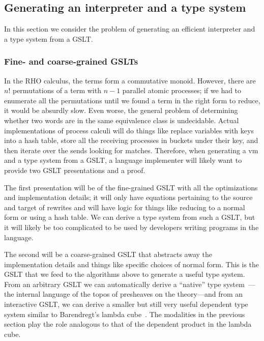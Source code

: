 \documentclass{article}
\begin{document}
\subsection{Generating an interpreter and a type system}
\label{Generating an interpreter and a type system}

In this section we consider the problem of generating an efficient interpreter and a type system from a GSLT.

\subsubsection{Fine- and coarse-grained GSLTs}
In the RHO calculus, the terms form a commutative monoid.  However, there are $n!$ permutations of a term with $n-1$ parallel atomic processes; if we had to enumerate all the permutations until we found a term in the right form to reduce, it would be absurdly slow.  Even worse, the general problem of determining whether two words are in the same equivalence class is undecidable.  Actual implementations of process calculi will do things like replace variables with keys into a hash table, store all the receiving processes in buckets under their key, and then iterate over the sends looking for matches.  Therefore, when generating a vm and a type system from a GSLT, a language implementer will likely want to provide two GSLT presentations and a proof.

The first presentation will be of the fine-grained GSLT with all the optimizations and implementation details; it will only have equations pertaining to the source and target of rewrites and will have logic for things like reducing to a normal form or using a hash table.  We can derive a type system from such a GSLT, but it will likely be too complicated to be used by developers writing programs in the language.

The second will be a coarse-grained GSLT that abstracts away the implementation details and things like specific choices of normal form.  This is the GSLT that we feed to the algorithms above to generate a useful type system.  From an arbitrary GSLT we can automatically derive a ``native'' type system~\cite{WilliamsStay2021}---the internal language of the topos of presheaves on the theory---and from an interactive GSLT, we can derive a smaller but still very useful dependent type system similar to Barendregt's lambda cube~\cite{HypercubePaper}.  The modalities in the previous section play the role analogous to that of the dependent product in the lambda cube.
\end{document}
